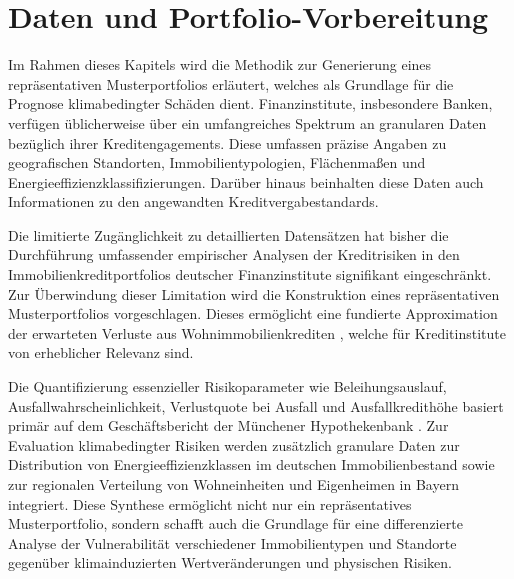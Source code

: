 \section{Daten und Portfolio-Vorbereitung}

Im Rahmen dieses Kapitels wird die Methodik zur Generierung eines repräsentativen Musterportfolios erläutert, welches als Grundlage für die Prognose klimabedingter Schäden dient. Finanzinstitute, insbesondere Banken, verfügen üblicherweise über ein umfangreiches Spektrum an granularen Daten bezüglich ihrer Kreditengagements. Diese umfassen präzise Angaben zu geografischen Standorten, Immobilientypologien, Flächenmaßen und Energieeffizienzklassifizierungen. Darüber hinaus beinhalten diese Daten auch Informationen zu den angewandten Kreditvergabestandards.

Die limitierte Zugänglichkeit zu detaillierten Datensätzen hat bisher die Durchführung umfassender empirischer Analysen der Kreditrisiken in den Immobilienkreditportfolios deutscher Finanzinstitute signifikant eingeschränkt. Zur Überwindung dieser Limitation wird die Konstruktion eines repräsentativen Musterportfolios vorgeschlagen. Dieses ermöglicht eine fundierte Approximation der erwarteten Verluste aus Wohnimmobilienkrediten , welche für Kreditinstitute von erheblicher Relevanz sind.

Die Quantifizierung essenzieller Risikoparameter wie Beleihungsauslauf, Ausfallwahrscheinlichkeit, Verlustquote bei Ausfall und Ausfallkredithöhe basiert primär auf dem Geschäftsbericht der Münchener Hypothekenbank \cite{MuenchenerHyp2022}. Zur Evaluation klimabedingter Risiken werden zusätzlich granulare Daten zur Distribution von Energieeffizienzklassen im deutschen Immobilienbestand sowie zur regionalen Verteilung von Wohneinheiten und Eigenheimen in Bayern integriert. Diese Synthese ermöglicht nicht nur ein repräsentatives Musterportfolio, sondern schafft auch die Grundlage für eine differenzierte Analyse der Vulnerabilität verschiedener Immobilientypen und Standorte gegenüber klimainduzierten Wertveränderungen und physischen Risiken.